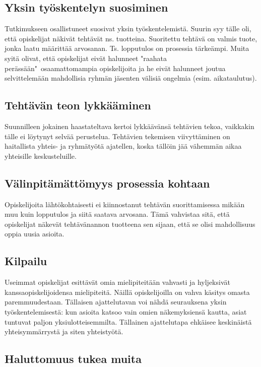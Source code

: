 \documentclass[finnish]{article}
\begin{document}
\subsection{Yksin työskentelyn suosiminen}

Tutkimukseen osallistuneet suosivat yksin työskentelemistä. Suurin syy tälle oli, että opiskelijat näkivät tehtävät ns. tuotteina. Suoritettu tehtävä on valmis tuote, jonka laatu määrittää arvosanan. Ts. lopputulos on prosessia tärkeämpi. Muita syitä olivat, että opiskelijat eivät halunneet "raahata perässään"~osaamattomampia opiskelijoita ja he eivät halunneet joutua selvittelemään mahdollisia ryhmän jäsenten välisiä ongelmia (esim. aikataulutus).

\subsection{Tehtävän teon lykkääminen}

Suunnilleen jokainen haastateltava kertoi lykkäävänsä tehtävien tekoa, vaikkakin tälle ei löytynyt selvää perustelua. Tehtävien tekemisen viivyttäminen on haitallista yhteis- ja ryhmätyötä ajatellen, koska tällöin jää vähemmän aikaa yhteisille keskusteluille.

\subsection{Välinpitämättömyys prosessia kohtaan}

Opiskelijoita lähtökohtaisesti ei kiinnostanut tehtävän suorittamisessa mikään muu kuin lopputulos ja siitä saatava arvosana. Tämä vahvistaa sitä, että opiskelijat näkevät tehtävänannon tuotteena sen sijaan, että se olisi mahdollisuus oppia uusia asioita.

\subsection{Kilpailu}

Useimmat opiskelijat esittävät omia mielipiteitään vahvasti ja hyljeksivät kanssaopiskelijoidensa mielipiteitä. Näillä opiskelijoilla on vahva käsitys omasta paremmuudestaan. Tällaisen ajattelutavan voi nähdä seurauksena yksin työskentelemisestä: kun asioita katsoo vain omien näkemyksiensä kautta, asiat tuntuvat paljon yksiulotteisemmilta. Tällainen ajattelutapa ehkäisee keskinäistä yhteisymmärrystä ja siten yhteistyötä.

\subsection{Haluttomuus tukea muita}
\end{document}
